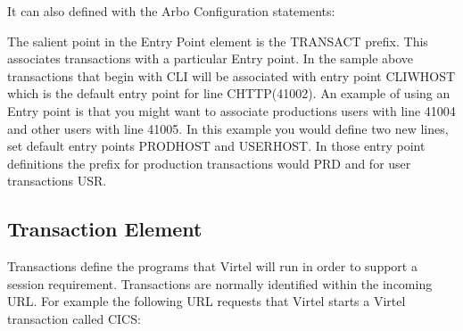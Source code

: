 \documentclass[letterpaper,10pt,english]{sphinxmanual}
\begin{document}
\sphinxAtStartPar
{}

\sphinxAtStartPar
It can also defined with the Arbo Configuration statements:\sphinxhyphen{}

\begin{sphinxVerbatim}[commandchars=\\\{\}]
                                       
           
                                           
                                           
                                               
                                              
                                        
                                          
                                         
                                        
\end{sphinxVerbatim}

\sphinxAtStartPar
The salient point in the Entry Point element is the TRANSACT prefix. This associates transactions with a particular Entry point. In the sample above transactions that begin with CLI will be associated with entry point CLIWHOST which is the default entry point for line C\sphinxhyphen{}HTTP(41002). An example of using an Entry point is that you might want to associate productions users with line 41004 and other users with line 41005. In this example you would define two new lines, set default entry points PRODHOST and USERHOST. In those entry point definitions the prefix for production transactions would PRD and for user transactions USR.


\subsection{Transaction Element}
\label{\detokenize{connectivity_guide:transaction-element}}
\sphinxAtStartPar
Transactions define the programs that Virtel will run in order to support a session requirement. Transactions are normally identified within the incoming URL. For example the following URL requests that Virtel starts a Virtel transaction called CICS:\sphinxhyphen{}
\end{document}
